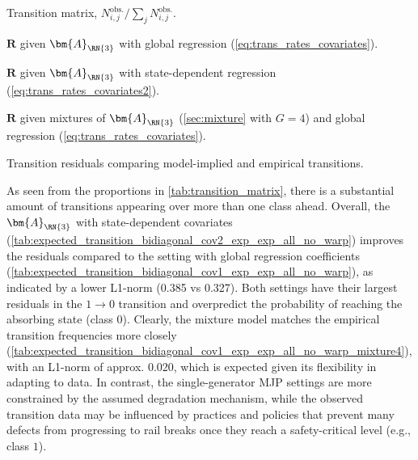 \begin{table}[h]
    \begin{subtable}[h]{0.45\textwidth}
        \centering
            
          \caption{Transition matrix, $ N_{i,j}^{\text{obs.}} / \sum_{j}  N_{i,j}^{\text{obs.}}$.}
       \label{tab:transition_matrix}
    \end{subtable}
    \hfill
    \begin{subtable}[h]{0.45\textwidth}
        \centering
       
        \caption{$\bm R$ given $\bm{A}_{\RN{3}}$ with global regression (\cref{eq:trans_rates_covariates}).}
        \label{tab:expected_transition_bidiagonal_cov1_exp_exp_all_no_warp}
     \end{subtable}
      \begin{subtable}[h]{0.45\textwidth} 
        \centering
         
        \caption{$\bm R$ given $\bm{A}_{\RN{3}}$ with state-dependent regression (\cref{eq:trans_rates_covariates2}).}
        \label{tab:expected_transition_bidiagonal_cov2_exp_exp_all_no_warp}
     \end{subtable}
     \hfill 
     \begin{subtable}[h]{0.45\textwidth} 
        \centering 
 
        \caption{$\bm R$ given mixtures of $\bm{A}_{\RN{3}}$ (\cref{sec:mixture} with $G = 4$) and global regression (\cref{eq:trans_rates_covariates}).}
        \label{tab:expected_transition_bidiagonal_cov1_exp_exp_all_no_warp_mixture4}
     \end{subtable} 
     \caption{Transition residuals comparing model-implied and empirical transitions.}
     \label{tab:transition_patterns}
\end{table}


As seen from the proportions in \cref{tab:transition_matrix}, there is a substantial amount of transitions appearing over more than one class ahead. Overall, the $\bm{A}_{\RN{3}}$ with state-dependent covariates (\cref{tab:expected_transition_bidiagonal_cov2_exp_exp_all_no_warp}) improves the residuals compared to the setting with global regression coefficients (\cref{tab:expected_transition_bidiagonal_cov1_exp_exp_all_no_warp}), as indicated by a lower L1-norm (0.385 vs 0.327). Both settings have their largest residuals in the $1 \rightarrow 0$ transition and overpredict the probability of reaching the absorbing state (class $0$). Clearly, the mixture model matches the empirical transition frequencies more closely (\cref{tab:expected_transition_bidiagonal_cov1_exp_exp_all_no_warp_mixture4}), with an L1-norm of approx. 0.020, which is expected given its flexibility in adapting to data. In contrast, the single-generator MJP settings are more constrained by the assumed degradation mechanism, while the observed transition data may be influenced by practices and policies that prevent many defects from progressing to rail breaks once they reach a safety-critical level (e.g., class $1$).

